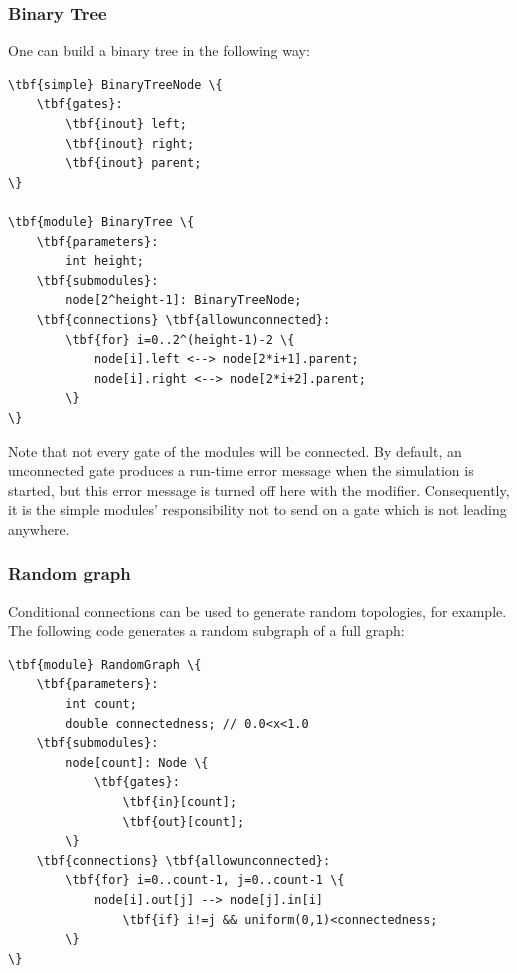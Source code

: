 \subsubsection{Binary Tree}

One can build a binary tree in the following way:

\begin{Verbatim}[commandchars=\\\{\}]
\tbf{simple} BinaryTreeNode \{
    \tbf{gates}:
        \tbf{inout} left;
        \tbf{inout} right;
        \tbf{inout} parent;
\}

\tbf{module} BinaryTree \{
    \tbf{parameters}:
        int height;
    \tbf{submodules}:
        node[2^height-1]: BinaryTreeNode;
    \tbf{connections} \tbf{allowunconnected}:
        \tbf{for} i=0..2^(height-1)-2 \{
            node[i].left <--> node[2*i+1].parent;
            node[i].right <--> node[2*i+2].parent;
        \}
\}
\end{Verbatim}

Note that not every gate of the modules will be connected. By default,
an unconnected gate produces a run-time error message when the
simulation is started, but this error message is turned off here with
the  modifier.
Consequently, it is the simple modules' responsibility not to send
on a gate which is not leading anywhere.



\subsubsection{Random graph}

Conditional connections can be used to generate random
topologies, for example. The following code
generates a random subgraph of a full graph:

\begin{Verbatim}[commandchars=\\\{\}]
\tbf{module} RandomGraph \{
    \tbf{parameters}:
        int count;
        double connectedness; // 0.0<x<1.0
    \tbf{submodules}:
        node[count]: Node \{
            \tbf{gates}:
                \tbf{in}[count];
                \tbf{out}[count];
        \}
    \tbf{connections} \tbf{allowunconnected}:
        \tbf{for} i=0..count-1, j=0..count-1 \{
            node[i].out[j] --> node[j].in[i]
                \tbf{if} i!=j && uniform(0,1)<connectedness;
        \}
\}
\end{Verbatim}

